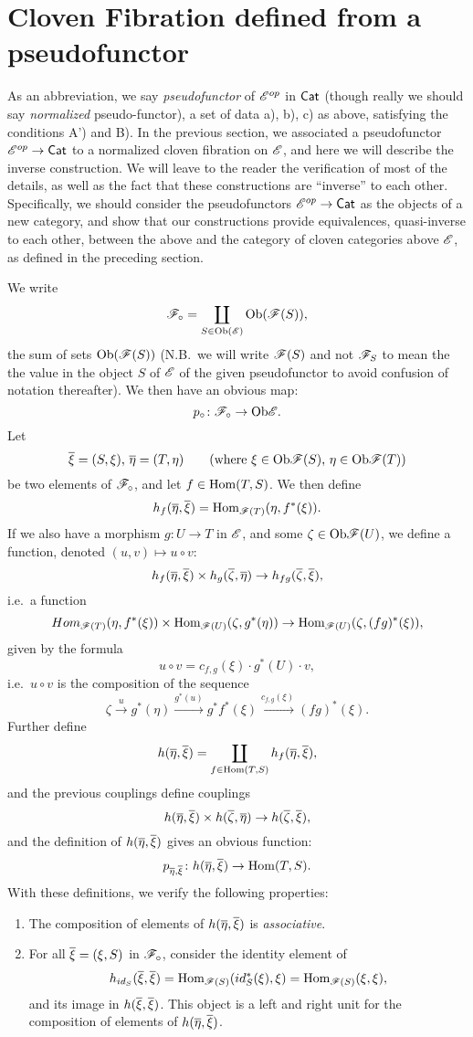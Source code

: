 \section{Cloven Fibration defined from a pseudofunctor}

As an abbreviation, we say \emph{pseudofunctor} of $\mathscr{E}^{op}$ in $\mathsf{Cat}$ (though really we should say \emph{normalized} pseudo-functor), a set of data a), b), c) as above, satisfying the conditions A') and B).
In the previous section, we associated a pseudofunctor $\mathscr{E}^{op}\to\mathsf{Cat}$ to a normalized cloven fibration on $\mathscr{E}$, and here we will describe the inverse construction.
We will leave to the reader the verification of most of the details, as well as the fact that these constructions are ``inverse'' to each other. 
Specifically, we should consider the pseudofunctors $\mathscr{E}^{op} \to \mathsf{Cat}$ as the objects of a new category, and show that our constructions provide equivalences, quasi-inverse to each other, between the above and the category of cloven categories above $\mathscr{E}$, as defined in the preceding section.

We write 
\[\mathscr{F}_\circ = \coprod_{S \in \mathrm{Ob} (\mathscr{E})} \mathrm{Ob}(\mathscr{F}(S)),\] 
the sum of sets $\mathrm{Ob}(\mathscr{F} (S))$ (N.B.\ we will write $\mathscr{F}(S)$ and not $\mathscr{F}_S$ to mean the the value in the object $S$ of $\mathscr{E}$ of the given pseudofunctor to avoid confusion of notation thereafter).
We then have an obvious map:
\[p_\circ \colon \mathscr{F}_\circ \to \mathrm{Ob} \mathscr{E}.\]
Let 
\[\overline \xi = (S, \xi), \, \overline \eta = (T, \eta) \qquad (\text{where } \xi \in \mathrm{Ob} \mathscr{F}(S), \, \eta \in \mathrm{Ob} \mathscr{F}(T))\]
be two elements of $\mathscr{F}_\circ$, and let $f \in \mathrm{Hom}(T,S)$.
We then define
\[h_f(\overline \eta, \overline \xi) = \mathrm{Hom}_{\mathscr{F}(T)}(\eta, f^\ast(\xi)).\]
If we also have a morphism $g \colon U \to T$ in $\mathscr{E}$, and some $\zeta \in \mathrm{Ob} \mathscr{F} (U)$, we define a function, denoted $(u,v) \mapsto u \circ v$:
\[h_f(\overline \eta, \overline \xi) \times h_g(\overline \zeta, \overline \eta) \to h_{fg}(\overline \zeta, \overline \xi),\]
i.e.\ a function
\[Hom_{\mathscr{F}(T)} (\eta, f^\ast(\xi)) \times \mathrm{Hom}_{\mathscr{F}(U)} (\zeta, g^\ast(\eta)) \to \mathrm{Hom}_{\mathscr{F}(U)} (\zeta, (fg)^\ast(\xi)),\]
given by the formula
\[u \circ v = c_{f,g} (\xi) \cdot g^\ast(U) \cdot v,\]
i.e.\ $u \circ v$ is the composition of the sequence 
\[
\zeta \xrightarrow{u} g^\ast(\eta) \xrightarrow{g^\ast(u)} g^\ast f^\ast(\xi) \xrightarrow{c_{f,g}(\xi)} (fg)^\ast(\xi).\]
Further define
\[
    h(\overline \eta, \overline \xi) = \coprod_{f \in \mathrm{Hom}(T,S)} h_f(\overline \eta, \overline \xi),
\]
and the previous couplings define couplings
\[h(\overline \eta, \overline \xi) \times h(\overline \zeta, \overline \eta) \to h(\overline \zeta, \overline \xi),\]
and the definition of $h (\overline \eta, \overline \xi)$ gives an obvious function:
\[p_{\overline \eta, \overline \xi}
\colon h(\overline \eta, \overline \xi) \to \mathrm{Hom}(T, S).\]
With these definitions, we verify the following properties:
\begin{enumerate}
    \item The composition of elements of $h (\overline \eta, \overline \xi)$ is \emph{associative}.
    \item For all $\overline \xi = (\xi, S)$ in $\mathscr{F}_\circ$, consider the identity element of
    \[h_{id_S} (\overline \xi, \overline \xi) = \mathrm{Hom}_{\mathscr{F}(S)} (id_S^\ast(\xi), \xi) = \mathrm{Hom}_{\mathscr{F}(S)}(\xi,\xi),\]
    and its image in $h (\overline \xi,\overline \xi)$.
        This object is a left and right unit for the composition of elements of $h (\overline \eta, \overline \xi)$.
\end{enumerate}

